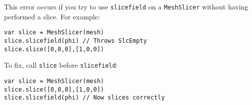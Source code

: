 This error occurs if you try to use \texttt{slicefield} on a
\texttt{MeshSlicer} without having performed a slice. For example:

\begin{lstlisting}
var slice = MeshSlicer(mesh)
slice.slicefield(phi) // Throws SlcEmpty
slice.slice([0,0,0],[1,0,0]) 
\end{lstlisting}

To fix, call \texttt{slice} before \texttt{slicefield}:

\begin{lstlisting}
var slice = MeshSlicer(mesh)
slice.slice([0,0,0],[1,0,0]) 
slice.slicefield(phi) // Now slices correctly 
\end{lstlisting}
